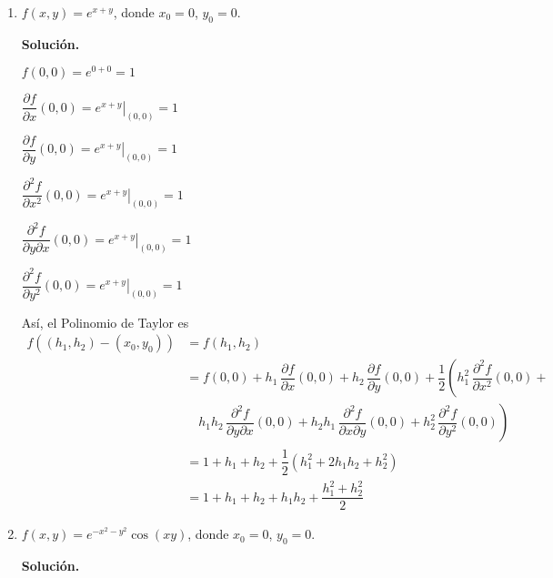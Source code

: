 \documentclass[fleqn, 12pt]{article}
\newcommand{\derivadaparcial}[2]{\dfrac{\partial {#1}}{\partial {#2}}}
\newcommand{\derivadaparcialn}[3]{\dfrac{\partial^{#3} {#1}}{\partial {#2}^{#3}}}
\newcommand{\derivadaparcialnd}[3]{\dfrac{\partial^{2} {#1}}{\partial {#3} \partial {#2}}}
\begin{document}
\begin{enumerate}
        \item $ f(x,y) = e^{x + y} $, donde $ x_0 = 0 $, $ y_0 = 0 $.
        
        \textbf{Solución.}

        $ f(0,0) = e^{0 + 0} = 1 $

        $ \derivadaparcial{f}{x} (0,0) = \left. e^{x + y} \right|_{(0,0)} = 1 $

        $ \derivadaparcial{f}{y} (0,0) = \left. e^{x + y} \right|_{(0,0)} = 1 $

        $ \derivadaparcialn{f}{x}{2} (0,0) = \left. e^{x + y} \right|_{(0,0)} = 1 $

        $ \derivadaparcialnd{f}{x}{y} (0,0) = \left. e^{x + y} \right|_{(0,0)} = 1 $

        $ \derivadaparcialn{f}{y}{2} (0,0) = \left. e^{x + y} \right|_{(0,0)} = 1 $

        Así, el Polinomio de Taylor es
        \begin{align*}
            f((h_1, h_2) - (x_0, y_0)) &= f(h_1, h_2) \\
            &= f(0,0) + h_1 \, \derivadaparcial{f}{x} (0,0) + h_2 \, \derivadaparcial{f}{y} (0,0) + \dfrac{1}{2} \left( h_1^2 \, \derivadaparcialn{f}{x}{2} (0,0) \right. + \\
            & \quad \left. h_1 h_2 \, \derivadaparcialnd{f}{x}{y} (0,0) + h_2 h_1 \, \derivadaparcialnd{f}{y}{x} (0,0) + h_2^2 \, \derivadaparcialn{f}{y}{2} (0,0) \right) \\
            &= 1 + h_1 + h_2 + \dfrac{1}{2} \left( h_1^2 + 2 h_1 h_2 + h_2^2 \right) \\
            &= 1 + h_1 + h_2 + h_1 h_2 + \dfrac{h_1^2 + h_2^2}{2}
        \end{align*}

        \item $ f(x,y) = e^{-x^2 - y^2} \cos (xy) $, donde $ x_0 = 0 $, $ y_0 = 0 $.
        
        \textbf{Solución.}
        

\end{enumerate}
\end{document}
